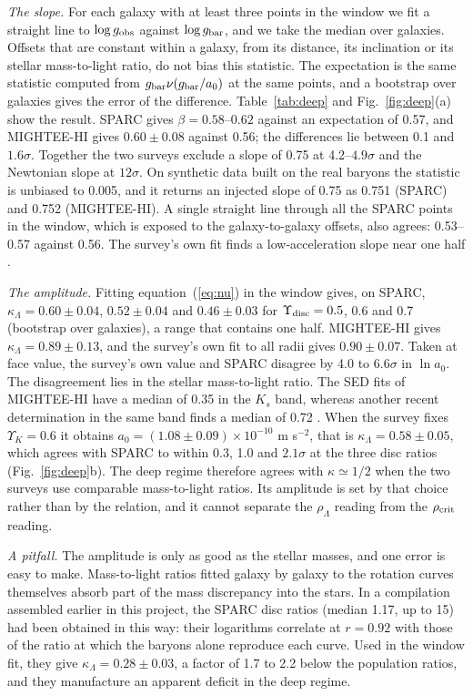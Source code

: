 \documentclass[fleqn,usenatbib]{mnras}
\begin{document}
\emph{The slope.} For each galaxy with at least three points in the window we fit a straight line to $\log g_{\rm obs}$ against $\log g_{\rm bar}$, and we take the median over galaxies. Offsets that are constant within a galaxy, from its distance, its inclination or its stellar mass-to-light ratio, do not bias this statistic. The expectation is the same statistic computed from $g_{\rm bar}\nu(g_{\rm bar}/a_0)$ at the same points, and a bootstrap over galaxies gives the error of the difference. Table~\ref{tab:deep} and Fig.~\ref{fig:deep}(a) show the result. SPARC gives $\beta=0.58$--$0.62$ against an expectation of 0.57, and MIGHTEE-HI gives $0.60\pm0.08$ against 0.56; the differences lie between 0.1 and $1.6\sigma$. Together the two surveys exclude a slope of 0.75 at 4.2--$4.9\sigma$ and the Newtonian slope at $12\sigma$. On synthetic data built on the real baryons the statistic is unbiased to 0.005, and it returns an injected slope of 0.75 as 0.751 (SPARC) and 0.752 (MIGHTEE-HI). A single straight line through all the SPARC points in the window, which is exposed to the galaxy-to-galaxy offsets, also agrees: 0.53--0.57 against 0.56. The survey's own fit finds a low-acceleration slope near one half \citep{Varasteanu2025}.

\emph{The amplitude.} Fitting equation~(\ref{eq:nu}) in the window gives, on SPARC, $\kappa_\Lambda=0.60\pm0.04$, $0.52\pm0.04$ and $0.46\pm0.03$ for $\Upsilon_{\rm disc}=0.5$, 0.6 and 0.7 (bootstrap over galaxies), a range that contains one half. MIGHTEE-HI gives $\kappa_\Lambda=0.89\pm0.13$, and the survey's own fit to all radii gives $0.90\pm0.07$. Taken at face value, the survey's own value and SPARC disagree by 4.0 to $6.6\sigma$ in $\ln a_0$. The disagreement lies in the stellar mass-to-light ratio. The SED fits of MIGHTEE-HI have a median of 0.35 in the $K_s$ band, whereas another recent determination in the same band finds a median of 0.72 \citep{Marasco2025}. When the survey fixes $\Upsilon_K=0.6$ it obtains $a_0=(1.08\pm0.09)\times10^{-10}$ m s$^{-2}$, that is $\kappa_\Lambda=0.58\pm0.05$, which agrees with SPARC to within 0.3, 1.0 and $2.1\sigma$ at the three disc ratios (Fig.~\ref{fig:deep}b). The deep regime therefore agrees with $\kappa\simeq1/2$ when the two surveys use comparable mass-to-light ratios. Its amplitude is set by that choice rather than by the relation, and it cannot separate the $\rho_\Lambda$ reading from the $\rho_{\rm crit}$ reading.

\emph{A pitfall.} The amplitude is only as good as the stellar masses, and one error is easy to make. Mass-to-light ratios fitted galaxy by galaxy to the rotation curves themselves absorb part of the mass discrepancy into the stars. In a compilation assembled earlier in this project, the SPARC disc ratios (median 1.17, up to 15) had been obtained in this way: their logarithms correlate at $r=0.92$ with those of the ratio at which the baryons alone reproduce each curve. Used in the window fit, they give $\kappa_\Lambda=0.28\pm0.03$, a factor of 1.7 to 2.2 below the population ratios, and they manufacture an apparent deficit in the deep regime.
\end{document}
